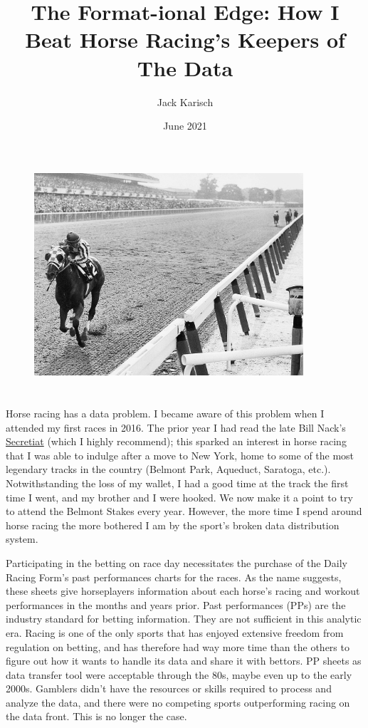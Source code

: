 \documentclass{article}
\title{The Format-ional Edge: How I Beat Horse Racing's Keepers of The Data}
\author{Jack Karisch}
\date{June 2021}
\begin{document}
\begin{figure}
  \centering
  \includegraphics[width=10cm]{images/secretariat.jpg}
\end{figure}

\maketitle

\section*{}

Horse racing has a data problem. I became aware of this problem when I attended my first races in 2016. The prior year I had read the late Bill Nack's \href{https://www.amazon.com/Secretariat-William-Nack/dp/0007410913/ref=tmm_pap_swatch_0?_encoding=UTF8&qid=1624916071&sr=8-2}{Secretiat} (which I highly recommend); this sparked an interest in horse racing that I was able to indulge after a move to New York, home to some of the most legendary tracks in the country (Belmont Park, Aqueduct, Saratoga, etc.). Notwithstanding the loss of my wallet, I had a good time at the track the first time I went, and my brother and I were hooked. We now make it a point to try to attend the Belmont Stakes every year. However, the more time I spend around horse racing the more bothered I am by the sport's broken data distribution system. 

Participating in the betting on race day necessitates the purchase of the Daily Racing Form's past performances charts for the races. As the name suggests, these sheets give horseplayers information about each horse's racing and workout performances in the months and years prior. Past performances (PPs) are the industry standard for betting information. They are not sufficient in this analytic era. Racing is one of the only sports that has enjoyed extensive freedom from regulation on betting, and has therefore had way more time than the others to figure out how it wants to handle its data and share it with bettors. PP sheets as data transfer tool were acceptable through the 80s, maybe even up to the early 2000s. Gamblers didn't have the resources or skills required to process and analyze the data, and there were no competing sports outperforming racing on the data front. This is no longer the case.
\end{document}
